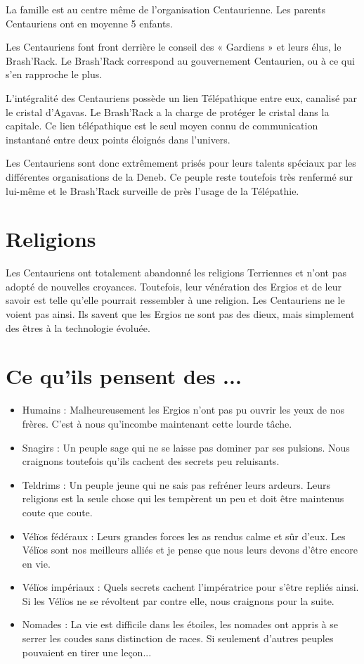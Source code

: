 \begin{multicols}{2}
La famille est au centre même de l'organisation Centaurienne. Les parents Centauriens ont en moyenne 5 enfants. 

Les Centauriens font front derrière le conseil des « Gardiens » et leurs élus, le Brash'Rack. Le Brash'Rack correspond au gouvernement Centaurien, ou à ce qui s'en rapproche le plus. 

L'intégralité des Centauriens possède un lien Télépathique entre eux, canalisé par le cristal d'Agavas. Le Brash'Rack a la charge de protéger le cristal dans la capitale. Ce lien télépathique est le seul moyen connu de communication instantané entre deux points éloignés dans l'univers.

Les Centauriens sont donc extrêmement prisés pour leurs talents spéciaux par les différentes organisations de la Deneb. Ce peuple reste toutefois très renfermé sur lui-même et le Brash'Rack surveille de près l'usage de la Télépathie. 

\section{Religions}

Les Centauriens ont totalement abandonné les religions Terriennes et n'ont pas adopté de nouvelles croyances. Toutefois, leur vénération des Ergios et de leur savoir est telle qu'elle pourrait ressembler à une religion. Les Centauriens ne le voient pas ainsi. Ils savent que les Ergios ne sont pas des dieux, mais simplement des êtres à la technologie évoluée.

\section{Ce qu'ils pensent des ...}

\begin{itemize}
\item Humains : Malheureusement les Ergios n'ont pas pu ouvrir les yeux de nos frères. C'est à nous qu'incombe maintenant cette lourde tâche.
\item Snagirs : Un peuple sage qui ne se laisse pas dominer par ses pulsions. Nous craignons toutefois qu'ils cachent des secrets peu reluisants.
\item Teldrims : Un peuple jeune qui ne sais pas refréner leurs ardeurs. Leurs religions est la seule chose qui les tempèrent un peu et doit être maintenus coute que coute.
\item Vélïos fédéraux : Leurs grandes forces les as rendus calme et sûr d'eux. Les Vélïos sont nos meilleurs alliés et je pense que nous leurs devons d'être encore en vie.
\item Vélïos impériaux : Quels secrets cachent l'impératrice pour s'être repliés ainsi. Si les Vélïos ne se révoltent par contre elle, nous craignons pour la suite.
\item Nomades : La vie est difficile dans les étoiles, les nomades ont appris à se serrer les coudes sans distinction de races. Si seulement d'autres peuples pouvaient en tirer une leçon...
\end{itemize}

\end{multicols}

